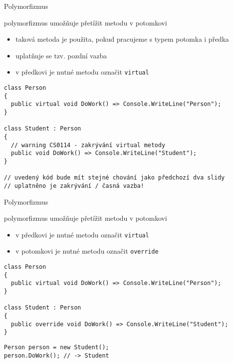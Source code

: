 \begin{frame}[fragile]
\begin{bitemize}{Polymorfizmus}
\item polymorfizmus umožňuje přetížit metodu v potomkovi
\begin{itemize}
\item taková metoda je použita, pokud pracujeme s typem potomka i předka
\item uplatňuje se tzv. pozdní vazba
\item v předkovi je nutné metodu označit \lstinline|virtual|
\end{itemize}
\end{bitemize}
\vfill
\begin{noblock}
\begin{lstlisting}[basicstyle=\small]
class Person
{
  public virtual void DoWork() => Console.WriteLine("Person");
}

class Student : Person
{
  // warning CS0114 - zakrývání virtual metody
  public void DoWork() => Console.WriteLine("Student");
}

// uvedený kód bude mít stejné chování jako předchozí dva slidy
// uplatněno je zakrývání / časná vazba!
\end{lstlisting}
\end{noblock}
\end{frame}



\begin{frame}[fragile]
\begin{bitemize}{Polymorfizmus}
\item polymorfizmus umožňuje přetížit metodu v potomkovi
\begin{itemize}
\item v předkovi je nutné metodu označit \lstinline|virtual|
\item v potomkovi je nutné metodu označit \lstinline|override|
\end{itemize}
\end{bitemize}
\vfill
\begin{yesblock}
\begin{lstlisting}[basicstyle=\small]
class Person
{
  public virtual void DoWork() => Console.WriteLine("Person");
}

class Student : Person
{
  public override void DoWork() => Console.WriteLine("Student");
}
\end{lstlisting}
\end{yesblock}
\vfill
\begin{yesblock}
\begin{lstlisting}[basicstyle=\small]
Person person = new Student();
person.DoWork(); // -> Student
\end{lstlisting}
\end{yesblock}
\end{frame}


